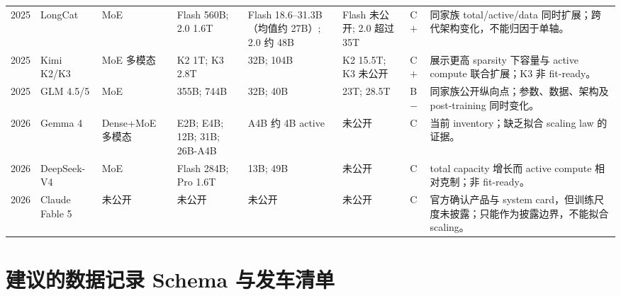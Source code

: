 \documentclass[UTF8,10pt,a4paper,fontset=none]{ctexart}
\begin{document}
\begin{longtable}{C{0.55cm}p{1.50cm}p{1.10cm}p{3.20cm}p{2.00cm}p{1.80cm}C{0.65cm}p{3.80cm}}
2025 & LongCat\cite{longcatflash,longcat2} & MoE & Flash 560B; 2.0 1.6T & Flash 18.6--31.3B（均值约 27B）; 2.0 约 48B & Flash 未公开; 2.0 超过 35T & C$+$ & 同家族 total/active/data 同时扩展；跨代架构变化，不能归因于单轴。 \\
2025 & Kimi K2/K3\cite{kimik2,kimik3} & MoE 多模态 & K2 1T; K3 2.8T & 32B; 104B & K2 15.5T; K3 未公开 & C$+$ & 展示更高 sparsity 下容量与 active compute 联合扩展；K3 非 fit-ready。 \\
2025 & GLM 4.5/5\cite{glm5} & MoE & 355B; 744B & 32B; 40B & 23T; 28.5T & B$-$ & 同家族公开纵向点；参数、数据、架构及 post-training 同时变化。 \\
2026 & Gemma 4\cite{gemma4} & Dense+\allowbreak MoE 多模态 & E2B; E4B; 12B; 31B; 26B-A4B & A4B 约 4B active & 未公开 & C & 当前 inventory；缺乏拟合 scaling law 的证据。 \\
2026 & DeepSeek-V4\cite{deepseekv4} & MoE & Flash 284B; Pro 1.6T & 13B; 49B & 未公开 & C & total capacity 增长而 active compute 相对克制；非 fit-ready。 \\
2026 & Claude Fable 5\cite{claudefable5} & 未公开 & 未公开 & 未公开 & 未公开 & C & 官方确认产品与 system card，但训练尺度未披露；只能作为披露边界，不能拟合 scaling。 \\
\end{longtable}

\clearpage
\section{建议的数据记录 Schema 与发车清单}
\label{app:schema}
\end{document}
